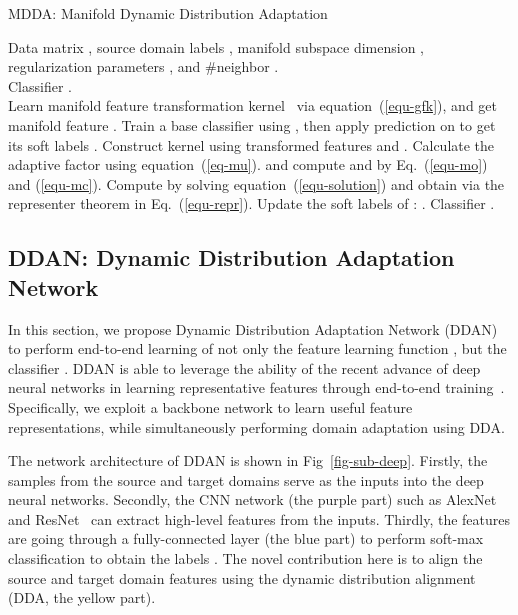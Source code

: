 \documentclass[acmsmall]{acmart}
\begin{document}
\begin{algorithm}[t!] 
	\caption{MDDA: Manifold Dynamic Distribution Adaptation}  
	\label{algo-mdda}  
	\renewcommand{\algorithmicrequire}{\textbf{Input:}} 
	\renewcommand{\algorithmicensure}{\textbf{Output:}}
	\begin{algorithmic}[1]  
		\REQUIRE 
		Data matrix , source domain labels , manifold subspace dimension , regularization parameters , and \#neighbor .\\
		\ENSURE 
		Classifier .\\
		\STATE Learn manifold feature transformation kernel~ via equation~(\ref{equ-gfk}), and get manifold feature .
		\STATE Train a base classifier using , then apply prediction on  to get its soft labels . 
		\STATE Construct kernel  using transformed features  and .
		\REPEAT 
		\STATE Calculate the adaptive factor  using equation~(\ref{eq-mu}).
		and compute  and  by Eq.~(\ref{equ-mo}) and (\ref{equ-mc}).
		\STATE Compute  by solving equation~(\ref{equ-solution}) and obtain  via the representer theorem in Eq.~(\ref{equ-repr}).
		\STATE Update the soft labels of : .
		\RETURN Classifier .  
	\end{algorithmic}  
\end{algorithm}

\label{sec-deep}
\subsection{DDAN: Dynamic Distribution Adaptation Network}

In this section, we propose Dynamic Distribution Adaptation Network (DDAN) to perform end-to-end learning of not only the feature learning function , but the classifier . DDAN is able to leverage the ability of the recent advance of deep neural networks in learning representative features through end-to-end training~\cite{bengio2013representation}. Specifically, we exploit a backbone network to learn useful feature representations, while simultaneously performing domain adaptation using DDA.

The network architecture of DDAN is shown in Fig~\ref{fig-sub-deep}. Firstly, the samples from the source and target domains serve as the inputs into the deep neural networks. Secondly, the CNN network (the purple part) such as AlexNet~\cite{krizhevsky2012imagenet} and ResNet~\cite{he2016deep} can extract high-level features from the inputs. Thirdly, the features are going through a fully-connected layer (the blue part) to perform soft-max classification to obtain the labels . The novel contribution here is to align the source and target domain features using the dynamic distribution alignment (DDA, the yellow part).
\end{document}

